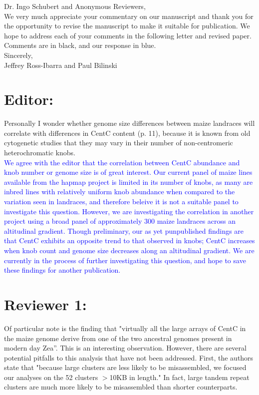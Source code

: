 \documentclass[]{article}
\newcommand{\res}[1]{\noindent \textcolor{blue}{{#1}} \\}
\begin{document}
\noindent Dr. Ingo Schubert and Anonymous Reviewers, \\

We very much appreciate your commentary on our manuscript and thank you for the opportunity to revise the manuscript to make it suitable for publication.  
We hope to address each of your comments in the following letter and revised paper. Comments are in black, and our response in blue.\\

\noindent Sincerely,\\

\noindent Jeffrey Ross-Ibarra and Paul Bilinski

\section*{Editor:}

Personally I wonder whether genome size differences between maize landraces will correlate with differences in CentC content (p. 11), because it is known from old cytogenetic studies that they may vary in their number of non-centromeric heterochromatic knobs. \\

\res{We agree with the editor that the correlation between CentC abundance and knob number or genome size is of great interest. 
 Our current panel of maize lines available from the hapmap project is limited in its number of knobs, as many are inbred lines with relatively uniform knob abundance when compared to the variation seen in landraces, and therefore beleive it is not a suitable panel to investigate this question.
However, we are investigating the correlation in another project using a broad panel of approximately 300 maize landraces across an altitudinal gradient.  
Though preliminary, our as yet punpublished findings are that CentC exhibits an opposite trend to that observed in knobs; CentC increases when knob count and genome size decreases along an altitudinal gradient.  
We are currently in the process of further investigating this question, and hope to save these findings for another publication.}

\section*{Reviewer 1:}

Of particular note is the finding that "virtually all the large arrays of CentC in the maize genome derive from one of the two ancestral genomes present in modern day Zea”.  This is an interesting observation.  However, there are several potential pitfalls to this analysis that have not been addressed.  First, the authors state that "because large clusters are less likely to be misassembled, we focused our analyses on the 52 clusters $>$10KB in length."  In fact, large tandem repeat clusters are much more likely to be misassembled than shorter counterparts.  \\
\end{document}
